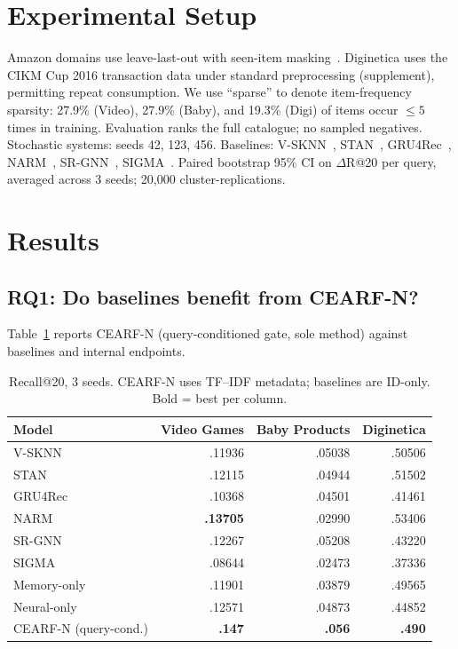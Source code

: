 \documentclass[runningheads]{llncs}
\newcommand{\method}{CEARF-N}
\begin{document}
\section{Experimental Setup}
Amazon domains use leave-last-out with seen-item
masking~\cite{mcauley2015amazon}. Diginetica uses the CIKM Cup 2016
transaction data under standard preprocessing (supplement), permitting repeat
consumption. We use ``sparse'' to denote item-frequency sparsity: 27.9\%
(Video), 27.9\% (Baby), and 19.3\% (Digi) of items occur $\leq 5$ times
in training. Evaluation ranks the full catalogue; no sampled negatives.
Stochastic systems: seeds 42, 123, 456. Baselines: V-SKNN~\cite{ludewig2018evaluation},
STAN~\cite{garg2019stan}, GRU4Rec~\cite{hidasi2016gru4rec},
NARM~\cite{li2017narm}, SR-GNN~\cite{wu2019srgnn},
SIGMA~\cite{sigma2025}. Paired bootstrap 95\% CI on $\Delta$R@20 per
query, averaged across 3 seeds; 20{,}000 cluster-replications.

\section{Results}

\subsection{RQ1: Do baselines benefit from \method{}?}

Table~\ref{tab:main} reports \method{} (query-conditioned gate, sole method)
against baselines and internal endpoints.

\begin{table}[H]
\caption{Recall@20, 3 seeds. \method{} uses TF--IDF metadata; baselines are
ID-only. Bold = best per column.}
\label{tab:main}
\centering\scriptsize
\setlength{\tabcolsep}{3.5pt}
\begin{tabular}{lrrr}
\toprule
Model & Video Games & Baby Products & Diginetica\\
\midrule
V-SKNN & .11936 & .05038 & .50506\\
STAN & .12115 & .04944 & .51502\\
GRU4Rec & .10368 & .04501 & .41461\\
NARM & \textbf{.13705} & .02990 & .53406\\
SR-GNN & .12267 & .05208 & .43220\\
SIGMA & .08644 & .02473 & .37336\\
\midrule
Memory-only & .11901 & .03879 & .49565\\
Neural-only & .12571 & .04873 & .44852\\
\method{} (query-cond.) & \textbf{.147} & \textbf{.056} & \textbf{.490}\\
\bottomrule
\end{tabular}
\end{table}
\end{document}
